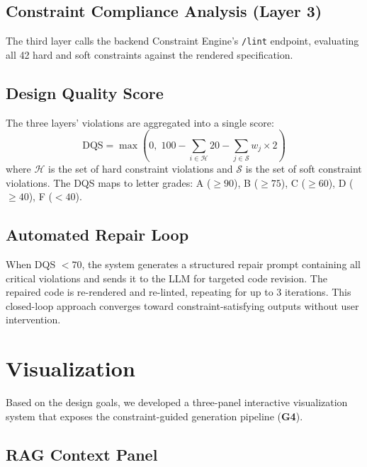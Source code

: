 \documentclass[final,5p,times,twocolumn]{elsarticle}
\begin{document}
\subsection{Constraint Compliance Analysis (Layer 3)}

The third layer calls the backend Constraint Engine's \texttt{/lint} endpoint, evaluating all 42 hard and soft constraints against the rendered specification.

\subsection{Design Quality Score}

The three layers' violations are aggregated into a single score:
\begin{equation}
\text{DQS} = \max\!\left(0, \; 100 - \sum_{i \in \mathcal{H}} 20 - \sum_{j \in \mathcal{S}} w_j \times 2\right)
\end{equation}
where $\mathcal{H}$ is the set of hard constraint violations and $\mathcal{S}$ is the set of soft constraint violations.
The DQS maps to letter grades: A ($\geq 90$), B ($\geq 75$), C ($\geq 60$), D ($\geq 40$), F ($< 40$).

\subsection{Automated Repair Loop}

When DQS $< 70$, the system generates a structured repair prompt containing all critical violations and sends it to the LLM for targeted code revision.
The repaired code is re-rendered and re-linted, repeating for up to 3 iterations.
This closed-loop approach converges toward constraint-satisfying outputs without user intervention.


\section{Visualization}
\label{sec:vis}

Based on the design goals, we developed a three-panel interactive visualization system that exposes the constraint-guided generation pipeline (\textbf{G4}).

\subsection{RAG Context Panel}
\end{document}
